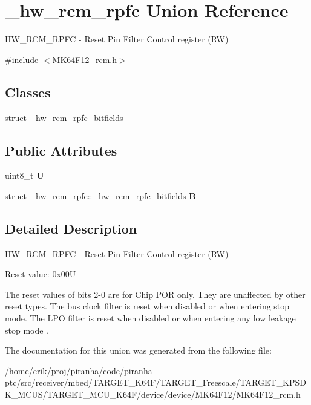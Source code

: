 \hypertarget{union__hw__rcm__rpfc}{}\section{\+\_\+hw\+\_\+rcm\+\_\+rpfc Union Reference}
\label{union__hw__rcm__rpfc}


H\+W\+\_\+\+R\+C\+M\+\_\+\+R\+P\+FC -\/ Reset Pin Filter Control register (RW)  




{\ttfamily \#include $<$M\+K64\+F12\+\_\+rcm.\+h$>$}

\subsection*{Classes}
\begin{DoxyCompactItemize}
\item 
struct \hyperlink{struct__hw__rcm__rpfc_1_1__hw__rcm__rpfc__bitfields}{\+\_\+hw\+\_\+rcm\+\_\+rpfc\+\_\+bitfields}
\end{DoxyCompactItemize}
\subsection*{Public Attributes}
\begin{DoxyCompactItemize}
\item 
uint8\+\_\+t {\bfseries U}\hypertarget{union__hw__rcm__rpfc_a838a289f0632990fd5dc9f92477784ae}{}\label{union__hw__rcm__rpfc_a838a289f0632990fd5dc9f92477784ae}

\item 
struct \hyperlink{struct__hw__rcm__rpfc_1_1__hw__rcm__rpfc__bitfields}{\+\_\+hw\+\_\+rcm\+\_\+rpfc\+::\+\_\+hw\+\_\+rcm\+\_\+rpfc\+\_\+bitfields} {\bfseries B}\hypertarget{union__hw__rcm__rpfc_a51bc6a42bf7f62a0170627c42cfcdf06}{}\label{union__hw__rcm__rpfc_a51bc6a42bf7f62a0170627c42cfcdf06}

\end{DoxyCompactItemize}


\subsection{Detailed Description}
H\+W\+\_\+\+R\+C\+M\+\_\+\+R\+P\+FC -\/ Reset Pin Filter Control register (RW) 

Reset value\+: 0x00U

The reset values of bits 2-\/0 are for Chip P\+OR only. They are unaffected by other reset types. The bus clock filter is reset when disabled or when entering stop mode. The L\+PO filter is reset when disabled or when entering any low leakage stop mode . 

The documentation for this union was generated from the following file\+:\begin{DoxyCompactItemize}
\item 
/home/erik/proj/piranha/code/piranha-\/ptc/src/receiver/mbed/\+T\+A\+R\+G\+E\+T\+\_\+\+K64\+F/\+T\+A\+R\+G\+E\+T\+\_\+\+Freescale/\+T\+A\+R\+G\+E\+T\+\_\+\+K\+P\+S\+D\+K\+\_\+\+M\+C\+U\+S/\+T\+A\+R\+G\+E\+T\+\_\+\+M\+C\+U\+\_\+\+K64\+F/device/device/\+M\+K64\+F12/M\+K64\+F12\+\_\+rcm.\+h\end{DoxyCompactItemize}
